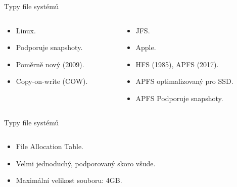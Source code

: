 \documentclass[aspectratio=169,xcolor=dvipsnames, t]{beamer}
\begin{document}
{\begin{frame}{Typy file systémů}
    \begin{columns}
    \begin{column}{0.45\textwidth}
        \begin{itemize}
            \item Linux.
            \item Podporuje snapshoty.
            \item Poměrně nový (2009).
            \item Copy-on-write (COW).
        \end{itemize}
    \end{column}
    \begin{column}{0.45\textwidth}  %
        \begin{itemize}
            \item JFS.
            \item Apple.
            \item HFS (1985), APFS (2017).
            \item APFS optimalizovaný pro SSD.
            \item APFS Podporuje snapshoty.
        \end{itemize}
    \end{column}
    \end{columns}
\end{frame}
\begin{frame}{Typy file systémů}
    \begin{columns}
    \begin{column}{0.45\textwidth}
        \begin{itemize}
            \item File Allocation Table.
            \item Velmi jednoduchý, podporovaný skoro všude.
            \item Maximální velikost souboru: 4GB.


\end{itemize}
\end{column}
\end{columns}
\end{frame}}
\end{document}

